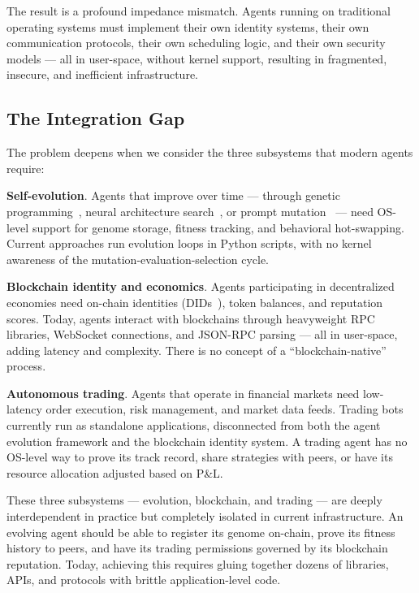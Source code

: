 \documentclass{article}
\begin{document}
The result is a profound impedance mismatch. Agents running on traditional operating systems must implement their own identity systems, their own communication protocols, their own scheduling logic, and their own security models — all in user-space, without kernel support, resulting in fragmented, insecure, and inefficient infrastructure.

\subsection{The Integration Gap}

The problem deepens when we consider the three subsystems that modern agents require:

\textbf{Self-evolution}. Agents that improve over time — through genetic programming~\cite{koza1992genetic}, neural architecture search~\cite{zoph2017neural, liu2019darts}, or prompt mutation~\cite{fernando2023promptbreeder} — need OS-level support for genome storage, fitness tracking, and behavioral hot-swapping. Current approaches run evolution loops in Python scripts, with no kernel awareness of the mutation-evaluation-selection cycle.

\textbf{Blockchain identity and economics}. Agents participating in decentralized economies need on-chain identities (DIDs~\cite{w3c_did_2022}), token balances, and reputation scores. Today, agents interact with blockchains through heavyweight RPC libraries, WebSocket connections, and JSON-RPC parsing — all in user-space, adding latency and complexity. There is no concept of a ``blockchain-native'' process.

\textbf{Autonomous trading}. Agents that operate in financial markets need low-latency order execution, risk management, and market data feeds. Trading bots currently run as standalone applications, disconnected from both the agent evolution framework and the blockchain identity system. A trading agent has no OS-level way to prove its track record, share strategies with peers, or have its resource allocation adjusted based on P\&L.

These three subsystems — evolution, blockchain, and trading — are deeply interdependent in practice but completely isolated in current infrastructure. An evolving agent should be able to register its genome on-chain, prove its fitness history to peers, and have its trading permissions governed by its blockchain reputation. Today, achieving this requires gluing together dozens of libraries, APIs, and protocols with brittle application-level code.
\end{document}
